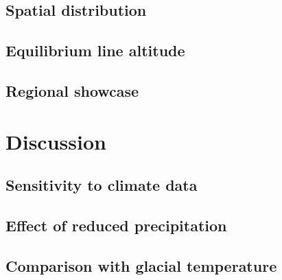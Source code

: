 \documentclass[manuscript]{copernicus}
\begin{document}
\subsection{Spatial distribution}

\subsection{Equilibrium line altitude}

\subsection{Regional showcase}

\section{Discussion}

\subsection{Sensitivity to climate data}

\subsection{Effect of reduced precipitation}

\subsection{Comparison with glacial temperature}
\end{document}
